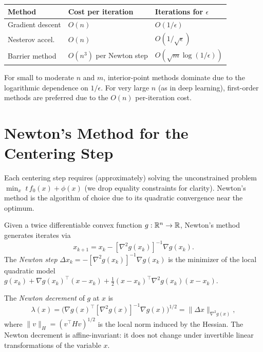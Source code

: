\documentclass[11pt,a4paper]{article}
\begin{document}
\begin{remark}%
\label{rem:comparison}
\begin{center}
\begin{tabular}{lll}
\toprule
\textbf{Method} & \textbf{Cost per iteration} &
  \textbf{Iterations for $\epsilon$} \\
\midrule
Gradient descent & $O(n)$ & $O(1/\epsilon)$ \\
Nesterov accel.\ & $O(n)$ & $O(1/\sqrt{\epsilon})$ \\
Barrier method & $O(n^3)$ per Newton step &
  $O(\sqrt{m}\log(1/\epsilon))$ \\
\bottomrule
\end{tabular}
\end{center}
For small to moderate $n$ and $m$, interior-point methods dominate
due to the logarithmic dependence on $1/\epsilon$. For very large $n$
(as in deep learning), first-order methods are preferred due to the
$O(n)$ per-iteration cost.
\end{remark}


\section{Newton's Method for the Centering Step}\label{sec:newton}

Each centering step requires (approximately) solving the unconstrained
problem $\min_x\; t\,f_0(x) + \phi(x)$ (we drop equality constraints
for clarity). Newton's method is the algorithm of choice due to its
quadratic convergence near the optimum.

\begin{definition}\label{def:newton}
Given a twice differentiable convex function $g : \mathbb{R}^n \to \mathbb{R}$, Newton's
method generates iterates via
\begin{equation}\label{eq:newton}
  x_{k+1} = x_k - [\nabla^2 g(x_k)]^{-1}\nabla g(x_k).
\end{equation}
The \emph{Newton step} $\Delta x_k = -[\nabla^2 g(x_k)]^{-1}\nabla g(x_k)$
is the minimizer of the local quadratic model
$g(x_k) + \nabla g(x_k)^\top(x - x_k)
+ \frac{1}{2}(x - x_k)^\top\nabla^2 g(x_k)(x - x_k)$.
\end{definition}

\begin{definition}\label{def:newton-decrement}
The \emph{Newton decrement} of $g$ at $x$ is
\begin{equation}\label{eq:newton-decrement}
  \lambda(x) = \bigl(\nabla g(x)^\top[\nabla^2 g(x)]^{-1}
  \nabla g(x)\bigr)^{1/2} = \|\Delta x\|_{\nabla^2 g(x)},
\end{equation}
where $\|v\|_H = (v^\top H v)^{1/2}$ is the local norm induced by
the Hessian. The Newton decrement is affine-invariant: it does not
change under invertible linear transformations of the variable $x$.
\end{definition}
\end{document}
